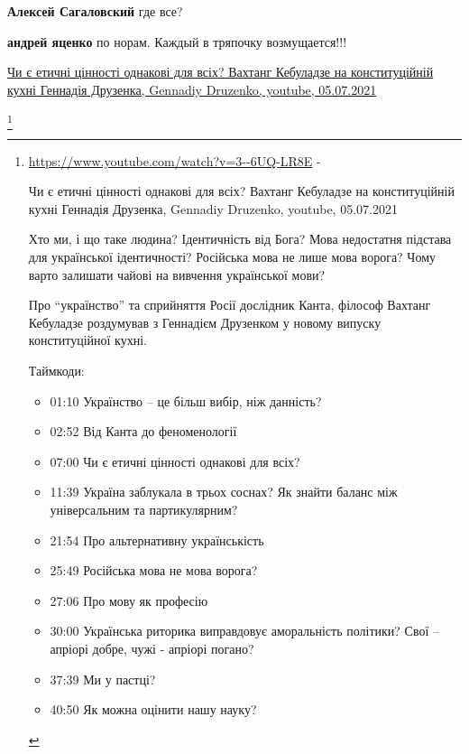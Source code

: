 \begin{itemize}
\begin{itemize}
\textbf{Алексей Сагаловский} где все?

 
\textbf{андрей яценко} по норам. Каждый в тряпочку возмущается!!!
\end{itemize}

 
\href{https://www.youtube.com/watch?v=3--6UQ-LR8E}{%
Чи є етичні цінності однакові для всіх? Вахтанг Кебуладзе на конституційній кухні Геннадія Друзенка, %
Gennadiy Druzenko, youtube, 05.07.2021%
}

\footnote{

\url{https://www.youtube.com/watch?v=3--6UQ-LR8E} - \par
Чи є етичні цінності однакові для всіх? Вахтанг Кебуладзе на конституційній кухні Геннадія Друзенка, %
Gennadiy Druzenko, youtube, 05.07.2021%

Хто ми, і що таке людина? Ідентичність від Бога? Мова недостатня підстава для
української ідентичності? Російська мова не лише мова ворога? Чому варто
залишати чайові на вивчення української мови?

Про \enquote{українство} та сприйняття Росії дослідник Канта, філософ Вахтанг Кебуладзе
роздумував з Геннадієм Друзенком у новому випуску конституційної кухні. 

Таймкоди:

\begin{itemize}
  \item 01:10 Українство – це більш вибір, ніж данність?
  \item 02:52 Від Канта до феноменології
  \item 07:00 Чи є етичні цінності однакові для всіх?
  \item 11:39 Україна заблукала  в трьох соснах? Як знайти баланс між універсальним та партикулярним?
  \item 21:54 Про альтернативну українськість 
  \item 25:49 Російська мова  не мова ворога?
  \item 27:06 Про мову як професію
  \item 30:00 Українська риторика виправдовує аморальність політики? Свої – апріорі добре, чужі - апріорі погано?
  \item 37:39 Ми у пастці?
  \item 40:50 Як можна оцінити нашу науку?
\end{itemize}

}
\end{itemize}
